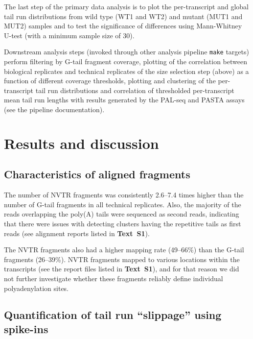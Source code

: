 \documentclass[10pt]{article}
\begin{document}
The last step of the primary data analysis is to plot the per-transcript and global tail run distributions from wild type (WT1 and WT2) and mutant (MUT1 and MUT2) samples and to test the significance of differences using Mann-Whitney U-test (with a minimum sample size of 30).

Downstream analysis steps (invoked through other analysis pipeline \texttt{make} targets) perform filtering by G-tail fragment coverage, plotting of the correlation between biological replicates and technical replicates of the size selection step (above) as a function of different coverage thresholds, plotting and clustering of the per-transcript tail run distributions and correlation of thresholded per-transcript mean tail run lengths with results generated by the PAL-seq \cite{subtelny14} and PASTA \cite{beilharz07} assays (see the pipeline documentation).

\section*{Results and discussion}

\subsection*{Characteristics of aligned fragments}

The number of NVTR fragments was consistently 2.6--7.4 times higher than the number of G-tail fragments in all technical replicates. Also, the majority of the reads overlapping the poly(A) tails were sequenced as second reads, indicating that there were issues with detecting clusters having the repetitive tails as first reads (see alignment reports listed in \textbf{Text~S1}).

The NVTR fragments also had a higher mapping rate (49--66\%) than the G-tail fragments (26--39\%).  NVTR fragments mapped to various locations within the transcripts (see the report files listed in \textbf{Text~S1}), and for that reason we did not further investigate whether these fragments reliably define individual polyadenylation sites.

\subsection*{Quantification of tail run ``slippage'' using spike-ins}
\end{document}
